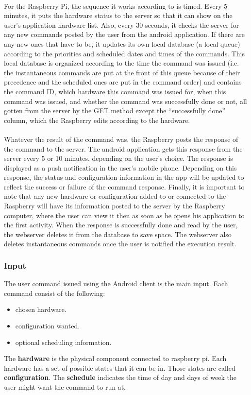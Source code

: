 \documentclass[12pt, oneside, a4paper]{book}
\begin{document}
				\paragraph{}For the Raspberry Pi, the sequence it works according to is timed. Every 5 minutes, it puts the hardware status to the server so that it can show on the user’s application hardware list. Also, every 30 seconds, it checks the server for any new commands posted by the user from the android application. If there are any new ones that have to be, it updates its own local database (a local queue) according to the priorities and scheduled dates and times of the commands. This local database is organized according to the time the command was issued (i.e. the instantaneous commands are put at the front of this queue because of their precedence and the scheduled ones are put in the command order) and contains the command ID, which hardware this command was issued for, when this command was issued, and whether the command was successfully done or not, all gotten from the server by the GET method except the “successfully done” column, which the Raspberry edits according to the hardware. 
				
				\paragraph{}Whatever the result of the command was, the Raspberry posts the response of the command to the server. The android application gets this response from the server every 5 or 10 minutes, depending on the user’s choice. The response is displayed as a push notification in the user’s mobile phone. Depending on this response, the status and configuration information in the app will be updated to reflect the success or failure of the command response. Finally, it is important to note that any new hardware or configuration added to or connected to the Raspberry will have its information posted to the server by the Raspberry computer, where the user can view it then as soon as he opens his application to the first activity. When the response is successfully done and read by the user, the webserver deletes it from the database to save space. The webserver also deletes instantaneous commands once the user is notified the execution result. 
				\subsubsection{Input}
				The user command issued using the Android client is the main input. Each command consist of the following:
				\begin{itemize}
					\item chosen hardware.
					\item configuration wanted.
					\item optional scheduling information.
				\end{itemize}
				The \textbf{hardware} is the physical component connected to raspberry pi. Each hardware has a set of possible states that it can be in. Those states are called \textbf{configuration}. The \textbf{schedule} indicates the time of day and days of week the user might want the command to run at.
\end{document}
